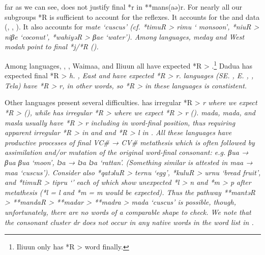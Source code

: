  far as we can see,
\citet{Blust1982} does not justify final *r in **mans(aə)r.
For nearly all our subgroups *R is sufficient to account for the reflexes.
It accounts for the 
and  data (, , ).
It also accounts for  \it{mate} ‘cuscus’ (cf.
*timuR > \it{rimu} ‘ monsoon’,
*niuR > \it{niβe} ‘coconut’,
*wahiyəR > \it{βae} ‘water’).
Among  languages,  \it{meday}
and West  \it{modah} point to final *j/*R ().

Among  languages, ,
, Waima{\Q}a, and Ili{\Q}uun all have expected *R > {\0}.\footnote{
		Ili{\Q}uun only has *R > {\0} word finally.}
Dadu{\Q}a has expected final *R > \it{h}.
, East  and  have expected *R > \it{r}.
 languages (SE. , E. , , Tela)
have *R > \it{r, {\0}} in other words,
so *R > {\0} in these languages is constistent.

Other  languages present several difficulties.
 has irregular *R > \it{r} where we expect *R > {\0} (),
while  has irregular *R > {\0} where we expect *R > \it{r}
(). 
 \it{mada},  \it{mada},
and  \it{masla} usually have *R > \it{r} including in
word-final position, thus requiring apparent irregular *R > {\0} in 
and  and *R > \it{l} in .
All these languages have productive processes of final VC{\#}
→ CV{\#} metathesis which is often followed by assimilation and/or
mutation of the original word-final consonant: e.g.
 \it{βua → βua {\tl} βua}
‘moon’, \it{lɔa → lɔa {\tl} lɔa} ‘rattan’.
(Something similar is attested in  \it{maa → maa} ‘cuscus’).
Consider also *qatəluR > \it{ternu} ‘egg’,
*kuluR > \it{urnu} ‘bread fruit’,
and *timuR > \it{tipru} ‘’ each of which show unexpected
*l > \it{n} and *m > \it{p} after metathesis (*l = \it{l}
and *m = \it{m} would be expected).
Thus the pathway **mantəR > **mandaR > **madar > **madra > 
\it{mada} ‘cuscus’ is possible,
though, unfortunately, there are no words of a comparable shape to check.
We note that the consonant cluster \it{dr} does not occur in
any native words in the  word list in \citet[409--448]{vanEngelenhoven2004}.


